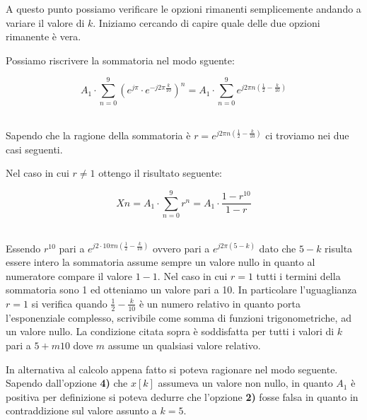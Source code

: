 \documentclass[../main.tex]{subfiles}
\begin{document}
A questo punto possiamo verificare le opzioni rimanenti semplicemente andando a variare il valore di $k$.
Iniziamo cercando di capire quale delle due opzioni rimanente è vera. 

Possiamo riscrivere la sommatoria nel modo sguente:

\[ A_1 \cdot \sum_{n = 0}^{9} ( e^{j\pi} \cdot e^{-j2\pi \frac{k}{10}})^n  = A_1 \cdot \sum_{n = 0}^{9} e^{j2\pi n (\frac{1}{2} - \frac{k}{10})} \]\

Sapendo che la ragione della sommatoria è $r = e^{j2\pi n (\frac{1}{2} - \frac{k}{10})}$ ci troviamo nei due casi seguenti.

Nel caso in cui $r \neq 1$ ottengo il risultato seguente:

\[ X{n} = A_1 \cdot \sum_{n = 0}^{9} r^n = A_1 \cdot \frac{1 - r^{10}}{1 - r}  \]\

Essendo $r^{10}$ pari a $e^{j2\cdot10\pi n (\frac{1}{2} - \frac{k}{10})}$ ovvero pari a $e^{j2\pi (5 - k)}$ dato che $5-k$ risulta essere intero la sommatoria assume sempre un valore nullo in quanto al numeratore compare il valore $1 - 1$.
Nel caso in cui $r = 1$ tutti i termini della sommatoria sono 1 ed otteniamo un valore pari a 10.
In particolare l'uguaglianza $r = 1$ si verifica quando $\frac{1}{2} - \frac{k}{10}$ è un numero relativo in quanto porta l'esponenziale complesso, scrivibile come somma di funzioni trigonometriche, ad un valore nullo.
La condizione citata sopra è soddisfatta per tutti i valori di $k$ pari a $5+m10$ dove $m$ assume un qualsiasi valore relativo.

In alternativa al calcolo appena fatto si poteva ragionare nel modo seguente. Sapendo dall'opzione \textbf{4)} che $x[k]$ assumeva un valore non nullo, in quanto $A_1$ è positiva per definizione si poteva dedurre che l'opzione \textbf{2)} fosse falsa in quanto in contraddizione sul valore assunto a $k =5$.
\end{document}
